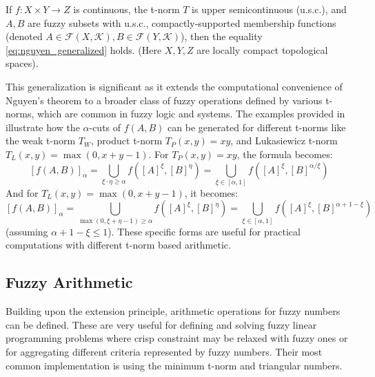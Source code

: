 \begin{theorem}
    If $f: X \times Y \to Z$ is continuous, the t-norm $T$ is upper semicontinuous (u.s.c.), and $A, B$ are fuzzy subsets with u.s.c., compactly-supported membership functions (denoted $A \in \mathcal{F}(X, \mathcal{K}), B \in \mathcal{F}(Y, \mathcal{K})$), then the equality \eqref{eq:nguyen_generalized} holds.
    (Here $X, Y, Z$ are locally compact topological spaces).
\end{theorem}
This generalization is significant as it extends the computational convenience of Nguyen's theorem to a broader class of fuzzy operations defined by various t-norms, which are common in fuzzy logic and systems.
The examples provided in \cite[p. 35]{FULLER2} illustrate how the $\alpha$-cuts of $f(A,B)$ can be generated for different t-norms like the weak t-norm $T_W$, product t-norm $T_P(x,y)=xy$, and Lukasiewicz t-norm $T_L(x,y) = \max(0, x+y-1)$.
For $T_P(x,y) = xy$, the formula becomes:
\[ [f(A, B)]_\alpha = \bigcup_{\xi \cdot \eta \ge \alpha} f([A]^\xi, [B]^\eta) = \bigcup_{\xi \in [\alpha,1]} f([A]^\xi, [B]^{\alpha/\xi}) \]
And for $T_L(x,y) = \max(0, x+y-1)$, it becomes:
\[ [f(A, B)]_\alpha = \bigcup_{\max(0,\xi+\eta-1) \ge \alpha} f([A]^\xi, [B]^\eta) = \bigcup_{\xi \in [\alpha,1]} f([A]^\xi, [B]^{\alpha+1-\xi}) \]
(assuming $\alpha+1-\xi \le 1$). These specific forms are useful for practical computations with different t-norm based arithmetic.












\subsection{Fuzzy Arithmetic}
\label{sec:fuzzy_arithmetic}

Building upon the extension principle, arithmetic operations for fuzzy numbers can be defined. These are very useful for defining and solving fuzzy linear programming problems where crisp constraint may be relaxed with fuzzy ones or for aggregating different criteria represented by fuzzy numbers. Their most common implementation is using the minimum t-norm and triangular numbers.

